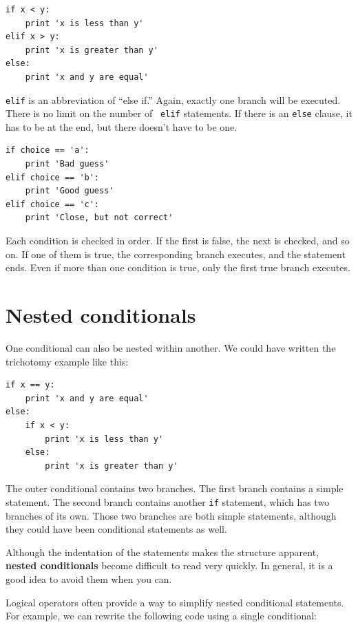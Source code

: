 \documentclass[10pt]{book}
\begin{document}
\beforeverb
\begin{verbatim}
if x < y:
    print 'x is less than y'
elif x > y:
    print 'x is greater than y'
else:
    print 'x and y are equal'
\end{verbatim}
\afterverb
%
{\tt elif} is an abbreviation of ``else if.''  Again, exactly one
branch will be executed.  There is no limit on the number of {\tt
elif} statements.  If there is an {\tt else} clause, it has to be
at the end, but there doesn't have to be one.



\beforeverb
\begin{verbatim}
if choice == 'a':
    print 'Bad guess'
elif choice == 'b':
    print 'Good guess'
elif choice == 'c':
    print 'Close, but not correct'
\end{verbatim}
\afterverb
%
Each condition is checked in order.  If the first is false,
the next is checked, and so on.  If one of them is
true, the corresponding branch executes, and the statement
ends.  Even if more than one condition is true, only the
first true branch executes.  


\section{Nested conditionals}

One conditional can also be nested within another.  We could have
written the trichotomy example like this:

\beforeverb
\begin{verbatim}
if x == y:
    print 'x and y are equal'
else:
    if x < y:
        print 'x is less than y'
    else:
        print 'x is greater than y'
\end{verbatim}
\afterverb
%
The outer conditional contains two branches.  The
first branch contains a simple statement.  The second branch
contains another {\tt if} statement, which has two branches of its
own.  Those two branches are both simple statements,
although they could have been conditional statements as well.

Although the indentation of the statements makes the structure
apparent, {\bf nested conditionals} become difficult to read very
quickly. In general, it is a good idea to avoid them when you can.

Logical operators often provide a way to simplify nested conditional
statements.  For example, we can rewrite the following code using a
single conditional:
\end{document}
